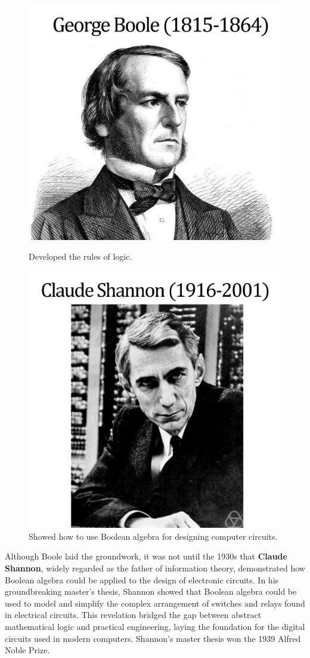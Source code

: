 \begin{figure}[h]
    \centering
    \begin{multicols}{2}  %

        \begin{center}
            \includegraphics[width=0.6\linewidth]{figure/boole.png}  %
            \caption{Developed the rules of logic.}
        \end{center}

        \begin{center}
            \includegraphics[width=0.6\linewidth]{figure/shannon.png}  %
            \caption{Showed how to use Boolean algebra for designing computer circuits.}
        \end{center}
    \end{multicols}
\end{figure}

Although Boole laid the groundwork, it was not until the 1930s that \textbf{Claude Shannon}, widely regarded as the father of information theory, demonstrated how Boolean algebra could be applied to the design of electronic circuits. In his groundbreaking master's thesis, Shannon showed that Boolean algebra could be used to model and simplify the complex arrangement of switches and relays found in electrical circuits. This revelation bridged the gap between abstract mathematical logic and practical engineering, laying the foundation for the digital circuits used in modern computers. Shannon's master thesis won the 1939 Alfred Noble Prize.

